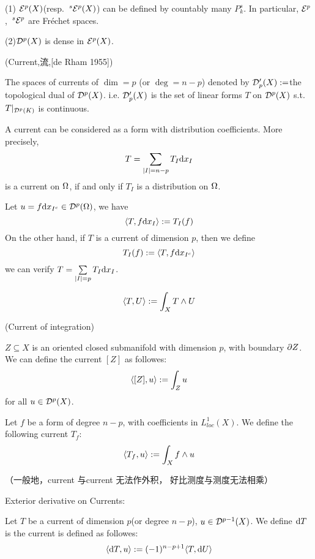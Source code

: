 \begin{rem}
(1) $\mathcal{E}^p(X)$(resp. $\,^s\mathcal{E}^p(X)$)
can be defined by countably many $P^s_k$.
In particular, $\mathcal{E}^p$, $\,^s\mathcal{E}^p$ are
Fr\'{e}chet spaces.

(2)$\mathcal{D}^p(X)$ is dense in $\mathcal{E}^p(X)$.
\end{rem}

\begin{definition}(Current,流,[de Rham 1955])

The spaces of currents of $\dim=p$ (or $\deg=n-p$)
denoted by $\mathcal{D}'_p(X):=$the topological dual of $\mathcal{D}^p(X)$.
i.e. $\mathcal{D}'_p(X)$ is the set of linear forms $T$ on $\mathcal{D}^p(X)$
s.t. $T|_{\mathcal{D}^p(K)}$ is continuous.
\end{definition}

\begin{rem}
A current can be considered as a form with
distribution coefficients.
More precisely,
$$
  T=\sum_{|I|=n-p}
    T_I\mathrm{d} x_I
$$
is a current on $\Omega$, if and only if $T_I$
is a distribution on $\Omega$.
\end{rem}

Let $u=f\mathrm{d} x_{I^c}
\in\mathcal{D}^p(\Omega)$, we have
$$
  \langle T,f\mathrm{d} x_I \rangle
:=T_I(f)
$$
On the other hand, if $T$ is a current of dimension $p$,
then we define
$$
  T_I(f):=\langle T,f\mathrm{d} x_{I^c} \rangle
$$
we can verify $T=\sum\limits_{|I|=p}T_I\mathrm{d} x_I$.

\begin{notation}
$$
  \langle T,U \rangle
:=
  \int_XT\wedge U
$$
\end{notation}

\begin{example}(Current of integration)

$Z\subseteq X$ is an oriented closed submanifold with
dimension $p$, with boundary $\partial Z$. We can define the current
$[Z]$ as followes:
$$\langle [Z],u \rangle:=\int_Zu$$
for all $u\in\mathcal{D}^p(X)$.
\end{example}

\begin{example}
Let $f$ be a form of degree $n-p$, with
coefficients in $L^1_{loc}(X)$. We define the following current $T_f$:
$$
  \langle T_f,u \rangle
:=
  \int_Xf\wedge u
$$
\end{example}

（一般地，current 与current 无法作外积，
好比测度与测度无法相乘）

Exterior derivative on Currents:

\begin{definition}
Let $T$ be a current of dimension $p$(or degree $n-p$),
$u\in\mathcal{D}^{p-1}(X)$. We define $\mathrm{d} T$ is the
current is defined as followes:
$$
  \langle \mathrm{d} T,u \rangle
:=
  (-1)^{n-p+1}
  \langle T,\mathrm{d} U \rangle
$$
\end{definition}

